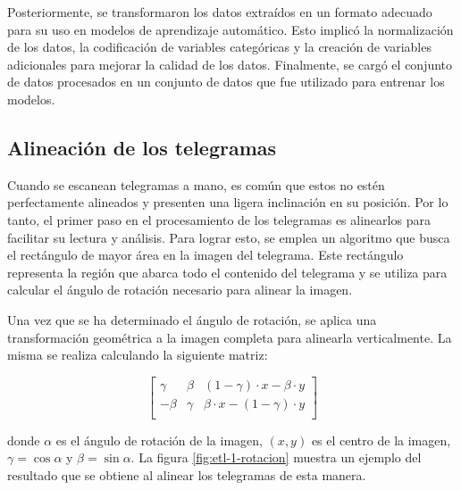 Posteriormente, se transformaron los datos extraídos en un formato adecuado para su uso en modelos de aprendizaje
automático. Esto implicó la normalización de los datos, la codificación de variables categóricas y la creación de
variables adicionales para mejorar la calidad de los datos. Finalmente, se cargó el conjunto de datos procesados en un
conjunto de datos que fue utilizado para entrenar los modelos.

\subsection{Alineación de los telegramas}
Cuando se escanean telegramas a mano, es común que estos no estén perfectamente alineados y presenten una ligera
inclinación en su posición. Por lo tanto, el primer paso en el procesamiento de los telegramas es alinearlos para
facilitar su lectura y análisis. Para lograr esto, se emplea un algoritmo que busca el rectángulo de mayor área en la
imagen del telegrama. Este rectángulo representa la región que abarca todo el contenido del telegrama y se utiliza para
calcular el ángulo de rotación necesario para alinear la imagen.

Una vez que se ha determinado el ángulo de rotación, se aplica una transformación geométrica a la imagen completa para
alinearla verticalmente. La misma se realiza calculando la siguiente matriz:

\begin{equation}
    \begin{bmatrix}
        \gamma & \beta  & (1-\gamma) \cdot  x - \beta \cdot y \\
        -\beta & \gamma & \beta \cdot  x - (1-\gamma) \cdot y \\
    \end{bmatrix}
    \label{eq:matriz-alineacion}
\end{equation}

\noindent
donde $\alpha$ es el ángulo de rotación de la imagen, $(x, y)$ es el centro de la imagen, $\gamma = \cos \alpha$ y $\beta = \sin \alpha$.
La figura \ref{fig:etl-1-rotacion} muestra un ejemplo del resultado que se obtiene al alinear los telegramas
de esta manera.


